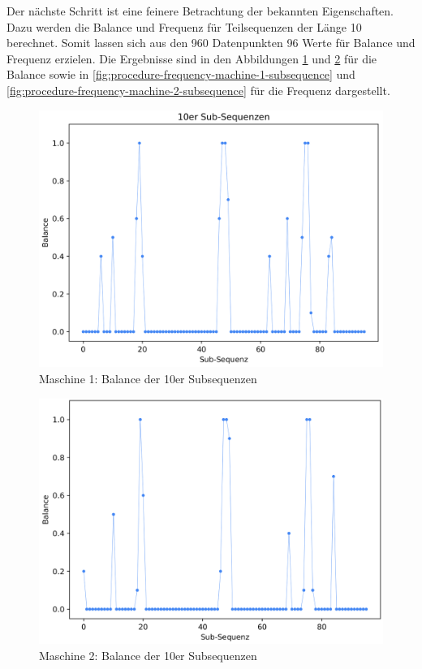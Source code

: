 Der nächste Schritt ist eine feinere Betrachtung der bekannten Eigenschaften. Dazu werden die Balance und Frequenz für Teilsequenzen der Länge 10 berechnet. Somit lassen sich aus den 960 Datenpunkten 96 Werte für Balance und Frequenz erzielen. Die Ergebnisse sind in den Abbildungen \ref{fig:procedure-balance-machine-1-subsequence} und \ref{fig:procedure-balance-machine-2-subsequence} für die Balance sowie in \ref{fig:procedure-frequency-machine-1-subsequence} und \ref{fig:procedure-frequency-machine-2-subsequence} für die Frequenz dargestellt.

\begin{figure}[H]
	\centering
	\includegraphics[scale=0.20]{images/procedure/balance_machine_1}
	\caption{Maschine 1: Balance der 10er Subsequenzen}
	\label{fig:procedure-balance-machine-1-subsequence}
\end{figure}

\begin{figure}[H]
	\centering
	\includegraphics[scale=0.20]{images/procedure/balance_machine_2}
	\caption{Maschine 2: Balance der 10er Subsequenzen}
	\label{fig:procedure-balance-machine-2-subsequence}
\end{figure}

